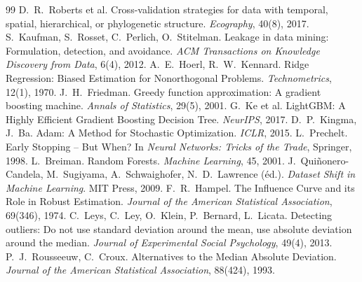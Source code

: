 \documentclass[11pt,a4paper]{report}
\begin{document}
\begin{thebibliography}{99}
 D.~R.~Roberts et al. Cross-validation strategies for data with temporal, spatial, hierarchical, or phylogenetic structure. \emph{Ecography}, 40(8), 2017.
 S.~Kaufman, S.~Rosset, C.~Perlich, O.~Stitelman. Leakage in data mining: Formulation, detection, and avoidance. \emph{ACM Transactions on Knowledge Discovery from Data}, 6(4), 2012.
 A.~E.~Hoerl, R.~W.~Kennard. Ridge Regression: Biased Estimation for Nonorthogonal Problems. \emph{Technometrics}, 12(1), 1970.
 J.~H.~Friedman. Greedy function approximation: A gradient boosting machine. \emph{Annals of Statistics}, 29(5), 2001.
 G.~Ke et al. LightGBM: A Highly Efficient Gradient Boosting Decision Tree. \emph{NeurIPS}, 2017.
 D.~P.~Kingma, J.~Ba. Adam: A Method for Stochastic Optimization. \emph{ICLR}, 2015.
 L.~Prechelt. Early Stopping -- But When? In \emph{Neural Networks: Tricks of the Trade}, Springer, 1998.
 L.~Breiman. Random Forests. \emph{Machine Learning}, 45, 2001.
 J.~Quiñonero-Candela, M.~Sugiyama, A.~Schwaighofer, N.~D.~Lawrence (éd.). \emph{Dataset Shift in Machine Learning}. MIT Press, 2009.
 F.~R.~Hampel. The Influence Curve and its Role in Robust Estimation. \emph{Journal of the American Statistical Association}, 69(346), 1974.
 C.~Leys, C.~Ley, O.~Klein, P.~Bernard, L.~Licata. Detecting outliers: Do not use standard deviation around the mean, use absolute deviation around the median. \emph{Journal of Experimental Social Psychology}, 49(4), 2013.
 P.~J.~Rousseeuw, C.~Croux. Alternatives to the Median Absolute Deviation. \emph{Journal of the American Statistical Association}, 88(424), 1993.
\end{thebibliography}
\end{document}
